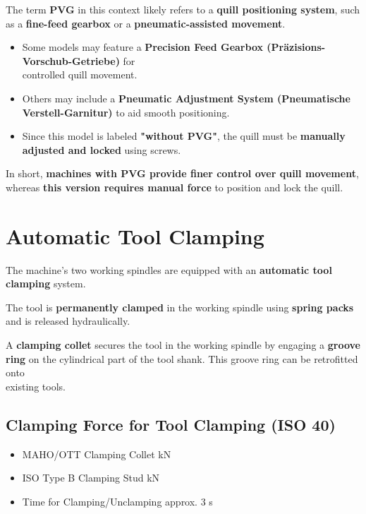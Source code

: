 The term \textbf{PVG} in this context likely refers to a \textbf{quill positioning system}, such as a \textbf{fine-feed gearbox} or a \textbf{pneumatic-assisted movement}.

\begin{itemize}
    \item Some models may feature a \textbf{Precision Feed Gearbox (Präzisions-Vorschub-Getriebe)} for \\controlled quill movement.
    \item Others may include a \textbf{Pneumatic Adjustment System (Pneumatische Verstell-Garnitur)} to aid smooth positioning.
    \item Since this model is labeled \textbf{"without PVG"}, the quill must be \textbf{manually adjusted and locked} using screws.
\end{itemize}

In short, \textbf{machines with PVG provide finer control over quill movement}, whereas \textbf{this version requires manual force} to position and lock the quill.


\section{Automatic Tool Clamping}
\setcounter{section}{12}

The machine's two working spindles are equipped with an \textbf{automatic tool clamping} system.

The tool is \textbf{permanently clamped} in the working spindle using \textbf{spring packs} and is released hydraulically.

A \textbf{clamping collet} secures the tool in the working spindle by engaging a \textbf{groove ring} on the cylindrical part of the tool shank. This groove ring can be retrofitted onto\\ existing tools.\footnotemark


\subsection{Clamping Force for Tool Clamping (ISO 40)}

\begin{itemize}[itemsep=1pt,parsep=0pt]
   \item MAHO/OTT Clamping Collet   kN \\
   \item ISO Type B Clamping Stud \dotfill {} kN \\
  \item  Time for Clamping/Unclamping \dotfill \> approx. 3 s
\end{itemize}

